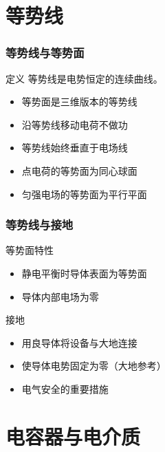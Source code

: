 \documentclass{beamer}
\begin{document}
\section{等势线}

\begin{frame}
    \frametitle{等势线与等势面}
    
    \begin{block}{定义}
        等势线是电势恒定的连续曲线。
    \end{block}
    
    \begin{itemize}
        \item 等势面是三维版本的等势线
        \item 沿等势线移动电荷不做功
        \item 等势线始终垂直于电场线
        \item 点电荷的等势面为同心球面
        \item 匀强电场的等势面为平行平面
    \end{itemize}
\end{frame}

\begin{frame}
    \frametitle{等势线与接地}
    
    \begin{block}{等势面特性}
        \begin{itemize}
            \item 静电平衡时导体表面为等势面
            \item 导体内部电场为零
        \end{itemize}
    \end{block}

    \begin{block}{接地}
        \begin{itemize}
            \item 用良导体将设备与大地连接
            \item 使导体电势固定为零（大地参考）
            \item 电气安全的重要措施
        \end{itemize}
    \end{block}
\end{frame}

\section{电容器与电介质}
\end{document}
